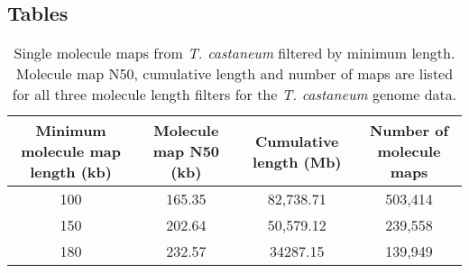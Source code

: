 \documentclass{bmcart}
\begin{document}
\begin{backmatter}


\section*{Tables}

\begin{table}[h!]
\caption{Single molecule maps from \textit{T. castaneum} filtered by minimum length. Molecule map N50, cumulative length and number of maps are listed for all three molecule length filters for the \textit{T. castaneum} genome data.}
      \begin{tabular}{cccc}
        \hline
         Minimum molecule map length (kb) & Molecule map N50 (kb) & Cumulative length (Mb) & Number of molecule maps\\ \hline
        100 & 165.35 & 82,738.71 & 503,414 \\
        150 & 202.64 & 50,579.12 & 239,558 \\ 
        180 & 232.57 & 34287.15 & 139,949 \\ \hline  
      \end{tabular}
\end{table}


\end{backmatter}
\end{document}
